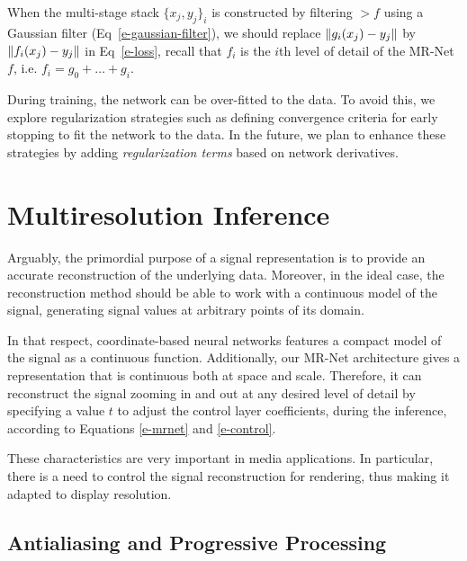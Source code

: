 When the multi-stage stack $\{x_j, y_j\}_i$ is constructed by filtering $\gt{f}$ using a Gaussian filter (Eq~\ref{e-gaussian-filter}), we should replace $\lVert g_i(x_j)-y_j\rVert$ by $\lVert f_i(x_j)-y_j\rVert$ in Eq~\ref{e-loss}, recall that $f_i$ is the $i$th level of detail of the MR-Net $f$, i.e. $f_i=g_0+\dots+g_{i}$.


During training, the network can be over-fitted to the data. To avoid this, we explore regularization strategies such as defining convergence criteria for early stopping to fit the network to the data. In the future, we plan to enhance these strategies by adding \textit{regularization terms} based on network derivatives. 



\section{Multiresolution Inference}

Arguably, the primordial purpose of a signal representation is to provide an accurate reconstruction of the underlying data. Moreover, in the ideal case, the reconstruction method should be able to work with a continuous model of the signal, generating signal values at arbitrary points of its domain.

In that respect, coordinate-based neural networks features a compact model of the signal as a continuous function. Additionally, our MR-Net architecture gives a representation that is continuous both at space and scale. 
Therefore, it can reconstruct the signal zooming in and out at any desired level of detail by specifying a value $t$ to adjust the control layer coefficients, during the inference, according to Equations \ref{e-mrnet} and \ref{e-control}.

These characteristics are very important in media applications. In particular, there is a need to control the signal reconstruction for rendering, thus making it adapted to display resolution.


\subsection{Antialiasing and Progressive Processing}

